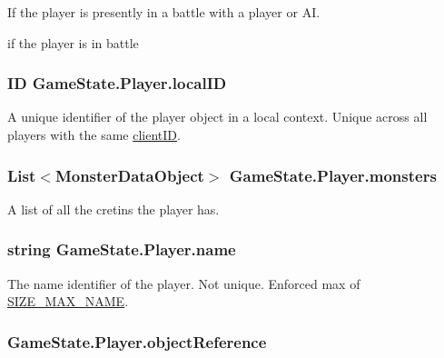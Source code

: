 If the player is presently in a battle with a player or A\-I. 

if the player is in battle\hypertarget{class_game_state_1_1_player_ae0383475b3348fb85ba5be64433443ff}{
\subsubsection[{local\-I\-D}]{\setlength{\rightskip}{0pt plus 5cm}I\-D Game\-State.\-Player.\-local\-I\-D}}\label{class_game_state_1_1_player_ae0383475b3348fb85ba5be64433443ff}


A unique identifier of the player object in a local context. Unique across all players with the same \hyperlink{class_game_state_1_1_player_aacc123df8ea5256f83c1060a5fdd19c2}{client\-I\-D}. 

\hypertarget{class_game_state_1_1_player_a4412b3835e68a55b00610438118cdb16}{
\subsubsection[{monsters}]{\setlength{\rightskip}{0pt plus 5cm}List$<${\bf Monster\-Data\-Object}$>$ Game\-State.\-Player.\-monsters}}\label{class_game_state_1_1_player_a4412b3835e68a55b00610438118cdb16}


A list of all the cretins the player has. 

\hypertarget{class_game_state_1_1_player_afc2b145df544ca5bffc7c87ef294bcde}{
\subsubsection[{name}]{\setlength{\rightskip}{0pt plus 5cm}string Game\-State.\-Player.\-name}}\label{class_game_state_1_1_player_afc2b145df544ca5bffc7c87ef294bcde}


The name identifier of the player. Not unique. Enforced max of \hyperlink{class_game_state_1_1_player_a1cdc9de8183b220e87632f7f6a7147d0}{S\-I\-Z\-E\-\_\-\-M\-A\-X\-\_\-\-N\-A\-M\-E}. 

\hypertarget{class_game_state_1_1_player_aebf24de01e14055dc940d0493753484f}{
\subsubsection[{object\-Reference}]{ Game\-State.\-Player.\-object\-Reference}}\label{class_game_state_1_1_player_aebf24de01e14055dc940d0493753484f}


